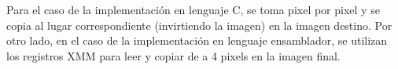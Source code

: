 \documentclass[a4paper]{article}
\begin{document}
\begin{figure}[!ht]
    \centering
    \begin{floatrow}
    \end{floatrow}
\end{figure}

Para el caso de la implementación en lenguaje C, se toma pixel por pixel y se copia al lugar correspondiente (invirtiendo la imagen)
en la imagen destino.
Por otro lado, en el caso de la implementación en lenguaje ensamblador, se utilizan los registros XMM para leer y copiar de a 4 pixels
en la imagen final.
\end{document}
